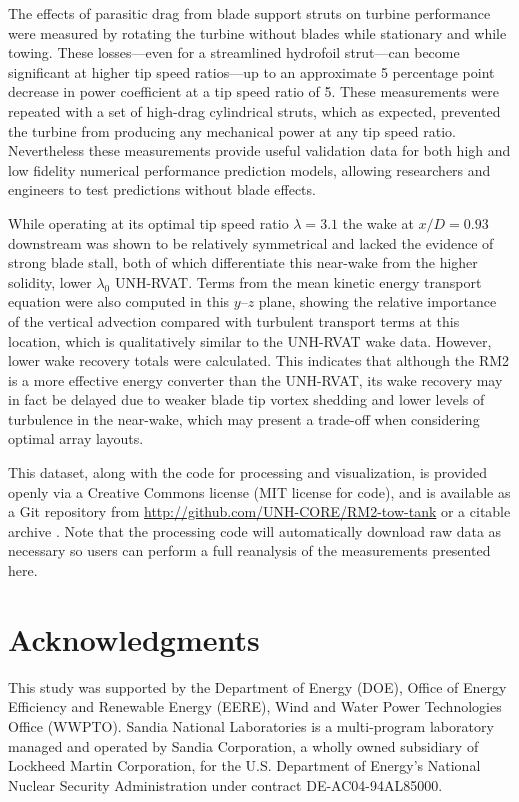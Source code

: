 The effects of parasitic drag from blade support struts on turbine performance
were measured by rotating the turbine without blades while stationary and while
towing. These losses---even for a streamlined hydrofoil strut---can become
significant at higher tip speed ratios---up to an approximate 5 percentage point
decrease in power coefficient at a tip speed ratio of 5. These measurements were
repeated with a set of high-drag cylindrical struts, which as expected,
prevented the turbine from producing any mechanical power at any tip speed
ratio. Nevertheless these measurements provide useful validation data for both
high and low fidelity numerical performance prediction models, allowing
researchers and engineers to test predictions without blade effects.

While operating at its optimal tip speed ratio $\lambda=3.1$ the wake at
$x/D=0.93$ downstream was shown to be relatively symmetrical and lacked the
evidence of strong blade stall, both of which differentiate this near-wake from
the higher solidity, lower $\lambda_0$ UNH-RVAT. Terms from the mean kinetic
energy transport equation were also computed in this $y$--$z$ plane, showing the
relative importance of the vertical advection compared with turbulent transport
terms at this location, which is qualitatively similar to the UNH-RVAT wake
data. However, lower wake recovery totals were calculated. This indicates that
although the RM2 is a more effective energy converter than the UNH-RVAT, its
wake recovery may in fact be delayed due to weaker blade tip vortex shedding and
lower levels of turbulence in the near-wake, which may present a trade-off when
considering optimal array layouts.

This dataset, along with the code for processing and visualization, is provided
openly via a Creative Commons license (MIT license for code), and is available
as a Git repository from \url{http://github.com/UNH-CORE/RM2-tow-tank} or a
citable archive \cite{Bachant2016-RM2-data}. Note that the processing code will
automatically download raw data as necessary so users can perform a full
reanalysis of the measurements presented here.


\section{Acknowledgments}

This study was supported by the Department of Energy (DOE), Office of Energy
Efficiency and Renewable Energy (EERE), Wind and Water Power Technologies Office
(WWPTO). Sandia National Laboratories is a multi-program laboratory managed and
operated by Sandia Corporation, a wholly owned subsidiary of Lockheed Martin
Corporation, for the U.S. Department of Energy's National Nuclear Security
Administration under contract DE-AC04-94AL85000.
